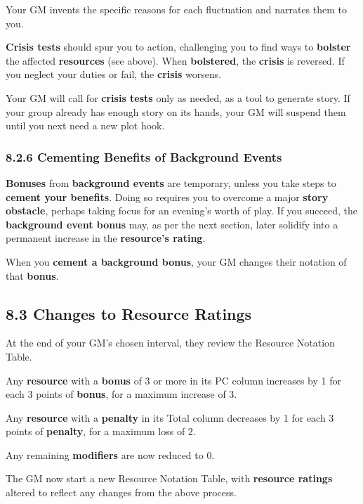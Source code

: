 \documentclass[
]{article}
\begin{document}
Your GM invents the specific reasons for each fluctuation and narrates
them to you.

\textbf{Crisis tests} should spur you to action, challenging you to find
ways to \textbf{bolster} the affected \textbf{resources} (see above).
When \textbf{bolstered}, the \textbf{crisis} is reversed. If you neglect
your duties or fail, the \textbf{crisis} worsens.

Your GM will call for \textbf{crisis tests} only as needed, as a tool to
generate story. If your group already has enough story on its hands,
your GM will suspend them until you next need a new plot hook.

\hypertarget{cementing-benefits-of-background-events}{%
\subsubsection{8.2.6 Cementing Benefits of Background
Events}\label{cementing-benefits-of-background-events}}

\textbf{Bonuses} from \textbf{background events} are temporary, unless
you take steps to \textbf{cement your benefits}. Doing so requires you
to overcome a major \textbf{story obstacle}, perhaps taking focus for an
evening's worth of play. If you succeed, the \textbf{background event
bonus} may, as per the next section, later solidify into a permanent
increase in the \textbf{resource's rating}.

When you \textbf{cement a background bonus}, your GM changes their
notation of that \textbf{bonus}.

\hypertarget{changes-to-resource-ratings}{%
\subsection{8.3 Changes to Resource
Ratings}\label{changes-to-resource-ratings}}

At the end of your GM's chosen interval, they review the Resource
Notation Table.

Any \textbf{resource} with a \textbf{bonus} of 3 or more in its PC
column increases by 1 for each 3 points of \textbf{bonus}, for a maximum
increase of 3.

Any \textbf{resource} with a \textbf{penalty} in its Total column
decreases by 1 for each 3 points of \textbf{penalty}, for a maximum loss
of 2.

Any remaining \textbf{modifiers} are now reduced to 0.

The GM now start a new Resource Notation Table, with \textbf{resource
ratings} altered to reflect any changes from the above process.
\end{document}
